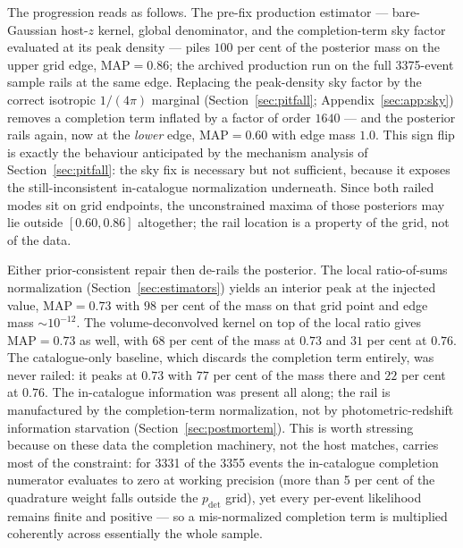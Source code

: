 The progression reads as follows. The pre-fix production estimator --- bare-Gaussian host-$z$ kernel, global denominator, and the completion-term sky factor evaluated at its peak density --- piles $100$ per cent of the posterior mass on the upper grid edge, $\mathrm{MAP} = 0.86$; the archived production run on the full 3375-event sample rails at the same edge. %
Replacing the peak-density sky factor by the correct isotropic $1/(4\pi)$ marginal (Section~\ref{sec:pitfall}; Appendix~\ref{sec:app:sky}) removes a completion term inflated by a factor of order $1640$ --- and the posterior rails again, now at the \emph{lower} edge, $\mathrm{MAP} = 0.60$ with edge mass $1.0$. %
This sign flip is exactly the behaviour anticipated by the mechanism analysis of Section~\ref{sec:pitfall}: the sky fix is necessary but not sufficient, because it exposes the still-inconsistent in-catalogue normalization underneath. Since both railed modes sit on grid endpoints, the unconstrained maxima of those posteriors may lie outside $[0.60, 0.86]$ altogether; the rail location is a property of the grid, not of the data.

Either prior-consistent repair then de-rails the posterior. The local ratio-of-sums normalization (Section~\ref{sec:estimators}) yields an interior peak at the injected value, $\mathrm{MAP} = 0.73$ with $98$ per cent of the mass on that grid point and edge mass $\sim 10^{-12}$. %
The volume-deconvolved kernel on top of the local ratio gives $\mathrm{MAP} = 0.73$ as well, with $68$ per cent of the mass at $0.73$ and $31$ per cent at $0.76$. %
The catalogue-only baseline, which discards the completion term entirely, was never railed: it peaks at $0.73$ with $77$ per cent of the mass there and $22$ per cent at $0.76$. %
The in-catalogue information was present all along; the rail is manufactured by the completion-term normalization, not by photometric-redshift information starvation (Section~\ref{sec:postmortem}). This is worth stressing because on these data the completion machinery, not the host matches, carries most of the constraint: for 3331 of the 3355 events the in-catalogue completion numerator evaluates to zero at working precision (more than 5 per cent of the quadrature weight falls outside the $p_\mathrm{det}$ grid), yet every per-event likelihood remains finite and positive --- so a mis-normalized completion term is multiplied coherently across essentially the whole sample. %

